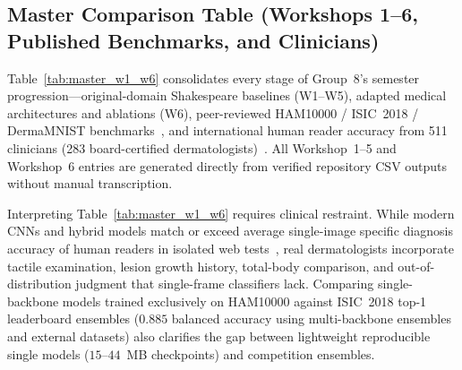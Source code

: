 \subsection{Master Comparison Table (Workshops 1--6, Published Benchmarks, and Clinicians)}
Table~\ref{tab:master_w1_w6} consolidates every stage of Group~8's semester progression—original-domain Shakespeare baselines (W1--W5), adapted medical architectures and ablations (W6), peer-reviewed HAM10000 / ISIC~2018 / DermaMNIST benchmarks~\cite{Codella2019skin,Yang2023medmnist}, and international human reader accuracy from 511 clinicians (283 board-certified dermatologists)~\cite{Tschandl2019comparison}. All Workshop~1--5 and Workshop~6 entries are generated directly from verified repository CSV outputs without manual transcription.

\begin{table}[htbp]
\centering
\caption{\textbf{Master results comparison across Workshops 1--6, published medical imaging benchmarks, and human dermatologists.} All reported W6 metrics are reproducible directly from submitted checkpoints via \texttt{src/evaluate\_medical.py}.}
\label{tab:master_w1_w6}
\scriptsize

\end{table}

Interpreting Table~\ref{tab:master_w1_w6} requires clinical restraint. While modern CNNs and hybrid models match or exceed average single-image specific diagnosis accuracy of human readers in isolated web tests~\cite{Tschandl2019comparison,Brinker2019deep}, real dermatologists incorporate tactile examination, lesion growth history, total-body comparison, and out-of-distribution judgment that single-frame classifiers lack. Comparing single-backbone models trained exclusively on HAM10000 against ISIC~2018 top-1 leaderboard ensembles ($0.885$ balanced accuracy using multi-backbone ensembles and external datasets) also clarifies the gap between lightweight reproducible single models ($15$--$44$~MB checkpoints) and competition ensembles.
